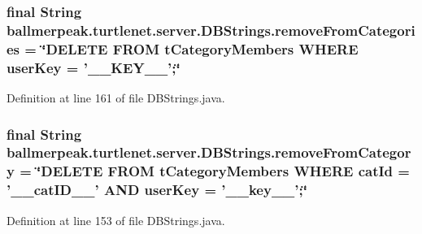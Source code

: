 \hypertarget{classballmerpeak_1_1turtlenet_1_1server_1_1DBStrings_a34489c428648e96854f7ae0665fa2830}{
\subsubsection[{remove\-From\-Categories}]{\setlength{\rightskip}{0pt plus 5cm}final String ballmerpeak.\-turtlenet.\-server.\-D\-B\-Strings.\-remove\-From\-Categories = \char`\"{}D\-E\-L\-E\-T\-E F\-R\-O\-M t\-Category\-Members W\-H\-E\-R\-E user\-Key = '\-\_\-\-\_\-\-K\-E\-Y\-\_\-\-\_\-';\char`\"{}\hspace{0.3cm}{\ttfamily [static]}}}\label{classballmerpeak_1_1turtlenet_1_1server_1_1DBStrings_a34489c428648e96854f7ae0665fa2830}


Definition at line 161 of file D\-B\-Strings.\-java.

\hypertarget{classballmerpeak_1_1turtlenet_1_1server_1_1DBStrings_a46667f523f0f1dad5378e5b23b49a18e}{
\subsubsection[{remove\-From\-Category}]{\setlength{\rightskip}{0pt plus 5cm}final String ballmerpeak.\-turtlenet.\-server.\-D\-B\-Strings.\-remove\-From\-Category = \char`\"{}D\-E\-L\-E\-T\-E F\-R\-O\-M t\-Category\-Members W\-H\-E\-R\-E cat\-Id = '\-\_\-\-\_\-cat\-I\-D\-\_\-\-\_\-' A\-N\-D user\-Key = '\-\_\-\-\_\-key\-\_\-\-\_\-';\char`\"{}\hspace{0.3cm}{\ttfamily [static]}}}\label{classballmerpeak_1_1turtlenet_1_1server_1_1DBStrings_a46667f523f0f1dad5378e5b23b49a18e}


Definition at line 153 of file D\-B\-Strings.\-java.

